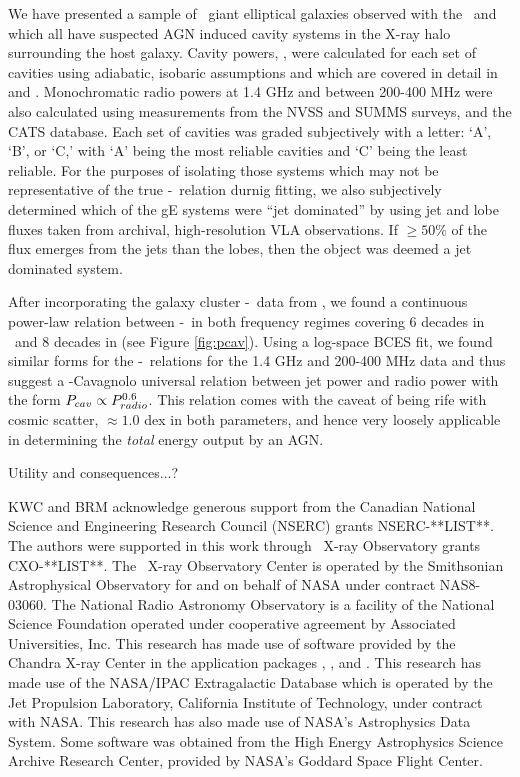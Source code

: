 \documentclass{emulateapj}
\begin{document}
We have presented a sample of \samp\ giant elliptical galaxies
observed with the \cxo\ and which all have suspected AGN induced
cavity systems in the X-ray halo surrounding the host galaxy. Cavity
powers, \pcav, were calculated for each set of cavities using
adiabatic, isobaric assumptions and which are covered in detail in
\citet{birzan04} and \citet{mcnamrev}. Monochromatic radio powers at
1.4 GHz and between 200-400 MHz were also calculated using
measurements from the NVSS and SUMMS surveys, and the CATS database.
Each set of cavities was graded subjectively with a letter: `A', `B',
or `C,' with `A' being the most reliable cavities and `C' being the
least reliable. For the purposes of isolating those systems which may
not be representative of the true \pcav-\prad\ relation durnig
fitting, we also subjectively determined which of the gE systems were
``jet dominated'' by using jet and lobe fluxes taken from archival,
high-resolution VLA observations. If $\ge 50\%$ of the flux emerges
from the jets than the lobes, then the object was deemed a jet
dominated system.

After incorporating the galaxy cluster \pcav-\prad\ data from
\citep{birzan08}, we found a continuous power-law relation between
\pcav-\prad\ in both frequency regimes covering 6 decades in
\prad\ and 8 decades in \pcav (see Figure \ref{fig:pcav}). Using a
log-space BCES fit, we found similar forms for the
\pcav-\prad\ relations for the 1.4 GHz and 200-400 MHz data and thus
suggest a \birzan-Cavagnolo universal relation between jet power and
radio power with the form $P_{cav} \propto P_{radio}^{0.6}$. This relation
comes with the caveat of being rife with cosmic scatter, $\approx 1.0$
dex in both parameters, and hence very loosely applicable in
determining the {\it{total}} energy output by an AGN.

Utility and consequences...?

\acknowledgements

KWC and BRM acknowledge generous support from the Canadian National
Science and Engineering Research Council (NSERC) grants
NSERC-**LIST**. The authors were supported in this work through
\chandra\ X-ray Observatory grants CXO-**LIST**. The \chandra\ X-ray
Observatory Center is operated by the Smithsonian Astrophysical
Observatory for and on behalf of NASA under contract NAS8-03060. The
National Radio Astronomy Observatory is a facility of the National
Science Foundation operated under cooperative agreement by Associated
Universities, Inc. This research has made use of software provided by
the Chandra X-ray Center in the application packages \ciao, \chips,
and \sherpa. This research has made use of the NASA/IPAC Extragalactic
Database which is operated by the Jet Propulsion Laboratory,
California Institute of Technology, under contract with NASA. This
research has also made use of NASA's Astrophysics Data System. Some
software was obtained from the High Energy Astrophysics Science
Archive Research Center, provided by NASA's Goddard Space Flight
Center.
\end{document}

